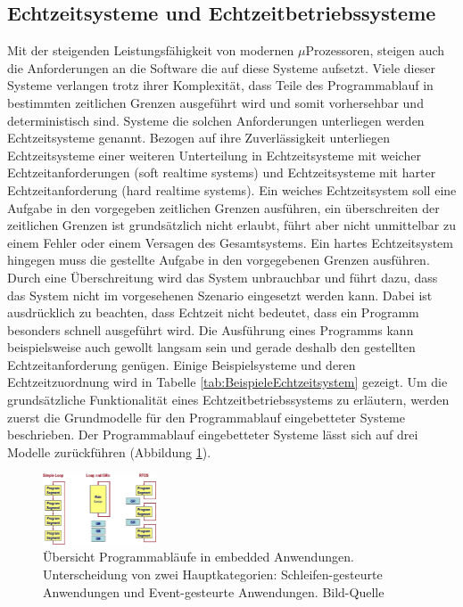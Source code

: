 \subsection{Echtzeitsysteme und Echtzeitbetriebssysteme}
\label{sec:Echtzeitsysteme}
Mit der steigenden Leis\-tungs\-fähig\-keit von modernen $\mu$\-Pro\-zesso\-ren, steigen auch die Anforderungen an die Software die auf diese Systeme aufsetzt. Viele dieser Systeme verlangen trotz ihrer Komplexität, dass Teile des Programmablauf in bestimmten zeitlichen Grenzen ausgeführt wird und somit vorhersehbar und deterministisch sind. Systeme die solchen Anforderungen unterliegen werden Echtzeitsysteme genannt. Bezogen auf ihre Zuverlässigkeit unterliegen Echtzeitsysteme einer weiteren Unterteilung in Echtzeitsysteme mit weicher Echtzeitanforderungen (soft realtime systems) und Echtzeitsysteme mit harter Echtzeitanforderung (hard realtime systems). Ein weiches Echtzeitsystem soll eine Aufgabe in den vorgegeben zeitlichen Grenzen ausführen, ein über\-schreiten der zeitlichen Grenzen ist grundsätzlich nicht erlaubt, führt aber nicht unmittelbar zu einem Fehler oder einem Versagen des Gesamtsystems. Ein hartes Echtzeitsystem hingegen muss die gestellte Aufgabe in den vorgegebenen Grenzen aus\-füh\-ren. Durch eine Überschreitung wird das System unbrauchbar und führt dazu, dass das System nicht im vorgesehenen Szenario eingesetzt werden kann. Dabei ist ausdrücklich zu beachten, dass Echtzeit nicht bedeutet, dass ein Programm besonders schnell ausgeführt wird. Die Ausführung eines Programms kann beispielsweise auch gewollt langsam sein und gerade deshalb den gestellten Echtzeitanforderung genügen. Einige Beispielsysteme und deren Echtzeitzuordnung wird in Tabelle \ref{tab:BeispieleEchtzeitsystem} gezeigt. Um die grund\-sätz\-liche Funktionalität eines Echtzeitbetriebssystems zu erläutern, werden zuerst die Grundmodelle für den Programmablauf eingebetteter Systeme beschrieben. Der Programmablauf eingebetteter Systeme lässt sich auf drei Modelle zu\-rück\-füh\-ren (Abbildung \ref{fig:Programmablauf}). 
\begin{figure}[ht]
	\centering
		\includegraphics[width=0.3\textwidth]{Pictures/EmbeddedCom/cwrtos2f5c.jpg}
	\caption{Übersicht Programmabläufe in embedded Anwendungen. Unterscheidung von zwei Hauptkategorien: Schleifen-gesteurte Anwendungen und Event-gesteurte Anwendungen. Bild-Quelle~\protect{}}
	\label{fig:Programmablauf}
\end{figure}
